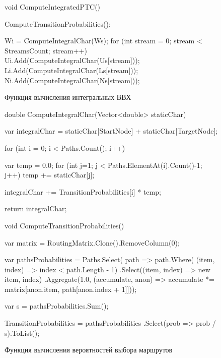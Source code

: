 \documentclass[oneside, final, 14pt, a4paper]{extreport}
\begin{document}
\begin{figure}[h!]
	\begin{listing}{1}
void ComputeIntegratedPTC()
{
  ComputeTransitionProbabilities();

  Wi = ComputeIntegralChar(Ws);
  for (int stream = 0; stream < StreamsCount; stream++)
  {
	Ui.Add(ComputeIntegralChar(Us[stream]));
	Li.Add(ComputeIntegralChar(Ls[stream]));
	Ni.Add(ComputeIntegralChar(Ns[stream]));
  }
}\end{listing}

	\caption{Функция вычисления интегральных ВВХ}
	\label{pic:function_computeIPTC}
\end{figure}

\begin{figure}[h!]
	\begin{listing}{1}
double ComputeIntegralChar(Vector<double> staticChar)
{
  var integralChar =
	staticChar[StartNode] + staticChar[TargetNode];

  for (int i = 0; i < Paths.Count(); i++)
  {
	var temp = 0.0;
	for (int j=1; j < Paths.ElementAt(i).Count()-1; j++)
	  temp += staticChar[j];

	integralChar += TransitionProbabilities[i] * temp;
  }

  return integralChar;
}\end{listing}

	\caption{}
	\label{pic:function_computeIntegralChar}
\end{figure}

\begin{figure}[h!]
	\begin{listing}{1}
void ComputeTransitionProbabilities()
  {
	var matrix = RoutingMatrix.Clone().RemoveColumn(0);

	var pathsProbabilities = 
	Paths.Select(
	path => path.Where(
	(item, index) => index < path.Length - 1)
	.Select((item, index) => new {item, index})
	.Aggregate(1.0, (accumulate, anon) => accumulate *=
	matrix[anon.item, path[anon.index + 1]]));

	var s = pathsProbabilities.Sum();

	TransitionProbabilities = pathsProbabilities
	.Select(prob => prob / s).ToList();
}\end{listing}

	\caption{Функция вычисления вероятностей выбора маршрутов}
	\label{pic:function_computeTransitionProbabilities}
\end{figure}
\end{document}
